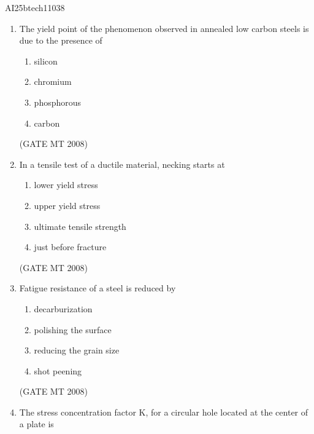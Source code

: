 \documentclass[journal, 11pt, onecolumn]{IEEEtran}
\theoremstyle{remark}
\begin{document}
\begin{center}
    \Large{AI25btech11038}
\end{center} 



\begin{enumerate}
\item The yield point of the phenomenon observed in annealed low carbon steels is due to the presence of

\begin{multicols}{4}
\begin{enumerate}
\item silicon
\item chromium
\item phosphorous 
\item carbon
\end{enumerate}
\end{multicols}

\hfill(GATE MT 2008)

\item In a tensile test of a ductile material, necking starts at

\begin{multicols}{2}
\begin{enumerate}
\item lower yield stress
\item upper yield stress
\item ultimate tensile strength
\item just before fracture
\end{enumerate}
\end{multicols}


\hfill(GATE MT 2008)

\item Fatigue resistance of a steel is reduced by

\begin{multicols}{2}
\begin{enumerate}
\item decarburization
\item polishing the surface
\item reducing the grain size
\item shot peening
\end{enumerate}
\end{multicols}


\hfill(GATE MT 2008)

\item The stress concentration factor K, for a circular hole located at the center of a plate is


\end{enumerate}
\end{document}
